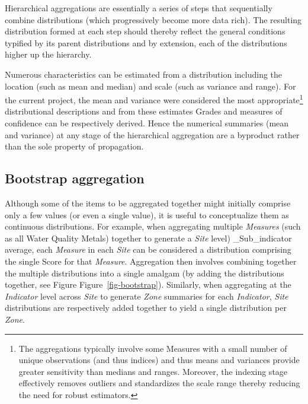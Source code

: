 \documentclass[
  8pt,
  a4paper]{article}
\begin{document}
Hierarchical aggregations are essentially a series of steps that
sequentially combine distributions (which progressively become more data
rich). The resulting distribution formed at each step should thereby
reflect the general conditions typified by its parent distributions and
by extension, each of the distributions higher up the hierarchy.

Numerous characteristics can be estimated from a distribution including
the location (such as mean and median) and scale (such as variance and
range). For the current project, the mean and variance were considered
the most appropriate\footnote{The aggregations
typically involve some Measures with a small number of unique
observations (and thus indices) and thus means and variances provide
greater sensitivity than medians and ranges. Moreover, the indexing
stage effectively removes outliers and standardizes the scale range
thereby reducing the need for robust estimators.} distributional
descriptions and from these estimates Grades and measures of confidence
can be respectively derived. Hence the numerical summaries (mean and
variance) at any stage of the hierarchical aggregation are a byproduct
rather than the sole property of propagation.

\subsection{Bootstrap aggregation}\label{bootstrap-aggregation}

Although some of the items to be aggregated together might initially
comprise only a few values (or even a single value), it is useful to
conceptualize them as continuous distributions. For example, when
aggregating multiple \emph{Measures} (such as all Water Quality Metals)
together to generate a \emph{Site} level) \_Sub\_indicator average, each
\emph{Measure} in each \emph{Site} can be considered a distribution
comprising the single Score for that \emph{Measure}. Aggregation then
involves combining together the multiple distributions into a single
amalgam (by adding the distributions together, see Figure
Figure~\ref{fig-bootstrap}). Similarly, when aggregating at the
\emph{Indicator} level across \emph{Site} to generate \emph{Zone}
summaries for each \emph{Indicator}, \emph{Site} distributions are
respectively added together to yield a single distribution per
\emph{Zone}.
\end{document}

